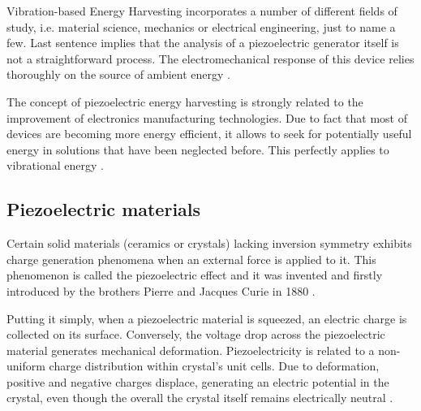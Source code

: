 \documentclass[12pt,a4paper]{article}
\begin{document}
Vibration-based Energy Harvesting incorporates a number of different fields of study, i.e. material science, mechanics or electrical engineering, just to name a few. Last sentence implies that the analysis of a piezoelectric generator itself is not a straightforward process. The electromechanical response of this device relies thoroughly on the source of ambient energy \cite{EnHv2}.
\par

The concept of piezoelectric energy harvesting is strongly related to the improvement of electronics manufacturing technologies. Due to fact that most of devices are becoming more energy efficient, it allows to seek for potentially useful energy in solutions that have been neglected before. This perfectly applies to vibrational energy \cite{low_freq}.

\subsection{Piezoelectric materials}
Certain solid materials (ceramics or crystals) lacking inversion symmetry exhibits charge generation phenomena when an external force is applied to it. This phenomenon is called the piezoelectric effect and it was invented and firstly introduced by the brothers Pierre and Jacques Curie in 1880 \cite{cmos}.\par
Putting it simply, when a piezoelectric material is squeezed, an electric charge is collected on its surface. Conversely, the voltage drop across the piezoelectric material generates mechanical deformation. Piezoelectricity is related to a non-uniform charge distribution within crystal's unit cells. Due to deformation, positive and negative charges displace, generating an electric potential in the crystal, even though the overall the crystal itself remains electrically neutral \cite{EnHv2}.
\end{document}

